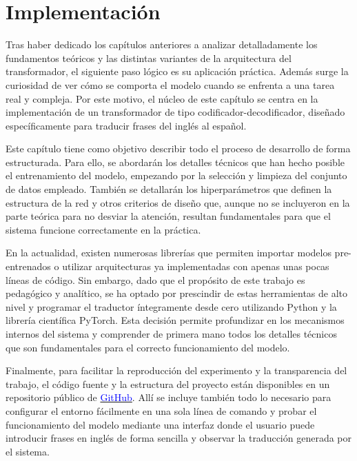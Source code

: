 \chapter{Implementación}
\label{cap:implementacion}

Tras haber dedicado los capítulos anteriores a analizar detalladamente los fundamentos teóricos 
y las distintas variantes de la arquitectura del transformador, el siguiente paso lógico es su aplicación práctica. 
Además surge la curiosidad de ver cómo se comporta el modelo cuando se enfrenta a una tarea real y compleja. 
Por este motivo, el núcleo de este capítulo se centra en la implementación de un transformador de tipo 
codificador-decodificador, diseñado específicamente para traducir frases del inglés al español.

Este capítulo tiene como objetivo describir todo el proceso de desarrollo de forma estructurada. 
Para ello, se abordarán los detalles técnicos que han hecho posible el entrenamiento del modelo, empezando por la 
selección y limpieza del conjunto de datos empleado. 
También se detallarán los hiperparámetros que definen la estructura de la red y otros criterios de diseño que, aunque 
no se incluyeron en la parte teórica para no desviar la atención, resultan fundamentales para que el sistema funcione 
correctamente en la práctica.

En la actualidad, existen numerosas librerías que permiten importar modelos pre-entrenados o utilizar 
arquitecturas ya implementadas con apenas unas pocas líneas de código. Sin embargo, dado que el propósito de este 
trabajo es pedagógico y analítico, se ha optado por prescindir de estas herramientas de alto nivel y programar el 
traductor íntegramente desde cero utilizando Python y la librería científica PyTorch. Esta decisión permite profundizar 
en los mecanismos internos del sistema y comprender de primera mano todos los detalles técnicos  que son fundamentales 
para el correcto funcionamiento del modelo.

Finalmente, para facilitar la reproducción del experimento y la transparencia del trabajo, el código fuente y 
la estructura del proyecto están disponibles en un repositorio 
público de \href{https://github.com/skaczylo/Transformer-Translator}{\textcolor{blue}{GitHub}}. 
Allí se incluye también todo lo necesario para configurar el entorno fácilmente en una sola línea de comando y 
probar el funcionamiento del modelo mediante una interfaz donde el usuario puede introducir frases en inglés 
de forma sencilla y observar la traducción generada por el sistema.


